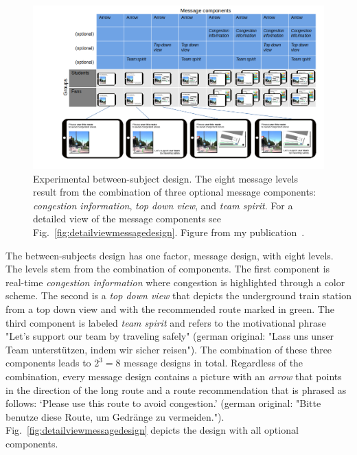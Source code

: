 \begin{figure}[hbt!]
\includegraphics[width=\textwidth,trim={3.3cm 0.5cm 1cm 0.5cm},clip]{figures/investigation/Nachrichtengestaltung/design1.png}
\caption[Experimental between-subject design]{Experimental between-subject design. The eight message levels result from the combination of three optional message components: \textit{congestion information}, \textit{top down view}, and \textit{team spirit}. For a detailed view of the message components see Fig.~\ref{fig:detailviewmessagedesign}. Figure from my publication~\cite{mayr-2023-cdyn}. 
}
\label{fig:eightcombincation}
\end{figure}


The between-subjects design has one factor, message design, with eight levels. The levels stem from the combination of components. The first component is real-time \textit{congestion information} where congestion is highlighted through a color scheme. The second is a \textit{top down view} that depicts the underground train station from a top down view and with the recommended route marked in green. The third component is labeled \textit{team spirit} and refers to the motivational phrase "Let's support our team by traveling safely" (german original: "Lass uns unser Team unterstützen, indem wir sicher reisen"). The combination of these three components leads to $2^3=8$ message designs in total.  Regardless of the combination, every message 
design contains a picture with an \textit{arrow} that points in the direction of the long route and a route recommendation that is phrased as follows: `Please use this route to avoid congestion.' (german original: "Bitte benutze diese Route, um Gedränge zu vermeiden."). Fig.~\ref{fig:detailviewmessagedesign} depicts the design with all optional components. 


